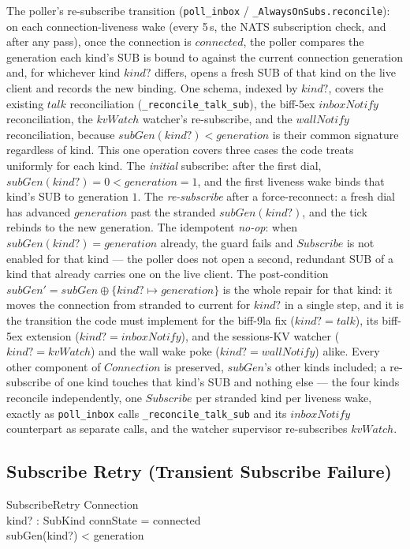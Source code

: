 \documentclass[a4paper,10pt,fleqn]{article}
\begin{document}
The poller's re-subscribe transition
(\texttt{poll\_inbox} / \texttt{\_AlwaysOnSubs.reconcile}): on each
connection-liveness wake (every 5\,s, the NATS subscription check, and after
any pass), once the connection is $connected$, the poller compares the generation each kind's
SUB is bound to against the current connection generation and, for
whichever kind $kind?$ differs, opens a fresh SUB of that kind on the live
client and records the new binding.  One schema, indexed by $kind?$,
covers the existing $talk$ reconciliation (\texttt{\_reconcile\_talk\_sub}),
the biff-5ex $inboxNotify$ reconciliation, the $kvWatch$
watcher's re-subscribe, and the $wallNotify$ reconciliation, because $subGen(kind?) < generation$ is their common signature
regardless of kind.  This one operation covers three cases the code
treats uniformly for each kind.  The \emph{initial} subscribe: after
the first dial, $subGen(kind?) = 0 < generation = 1$, and the first
liveness wake binds that kind's SUB to generation $1$.  The \emph{re-subscribe} after a
force-reconnect: a fresh dial has advanced $generation$ past the stranded
$subGen(kind?)$, and the tick rebinds to the new generation.  The
idempotent \emph{no-op}: when $subGen(kind?) = generation$ already, the
guard fails and $Subscribe$ is not enabled for that kind --- the poller
does not open a second, redundant SUB of a kind that already carries one
on the live client.  The post-condition $subGen' = subGen \oplus \{
kind? \mapsto generation \}$ is the whole repair for that kind: it moves
the connection from stranded to current for $kind?$ in a single step, and
it is the transition the code must implement for the biff-9la fix
($kind? = talk$), its biff-5ex extension ($kind? = inboxNotify$), and the
sessions-KV watcher ($kind? = kvWatch$) and the wall wake poke
($kind? = wallNotify$) alike.  Every other component of $Connection$ is preserved, $subGen$'s
other kinds included; a re-subscribe of one kind touches that kind's SUB
and nothing else --- the four kinds reconcile independently, one
$Subscribe$ per stranded kind per liveness wake, exactly as \texttt{poll\_inbox}
calls \texttt{\_reconcile\_talk\_sub} and its $inboxNotify$ counterpart
as separate calls, and the watcher supervisor re-subscribes $kvWatch$.

\subsection{Subscribe Retry (Transient Subscribe Failure)}

\begin{schema}{SubscribeRetry}
  \Xi Connection \\
  kind? : SubKind
  \where
  connState = connected \\
  subGen(kind?) < generation
\end{schema}
\end{document}
